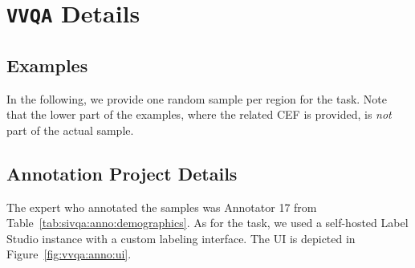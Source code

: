 \section{\texttt{VVQA} Details}
\label{appendix:sec:vvqa}
%

\subsection{Examples}
\label{appendix:sec:vvqa:examples}
%
In the following, we provide one random sample per region for the \vvqa task.
%
Note that the lower part of the examples, where the related CEF is provided, is \emph{not} part of the actual sample.
%
\subsubsection*{\RegA}
%

%
\subsubsection*{\RegAP}
%

%
\subsubsection*{\RegE}
%

%
\subsubsection*{\RegLAC}
%

%
\subsubsection*{\RegSA}
%

%
\subsubsection*{\RegW}
%

%



\subsection{Annotation Project Details}
\label{appendix:sec:vvqa:anno}
%
The expert who annotated the samples was Annotator 17 from Table~\ref{tab:sivqa:anno:demographics}.
%
As for the \sivqa task, we used a self-hosted Label Studio instance with a custom labeling interface.
%
The UI is depicted in Figure~\ref{fig:vvqa:anno:ui}.
%

